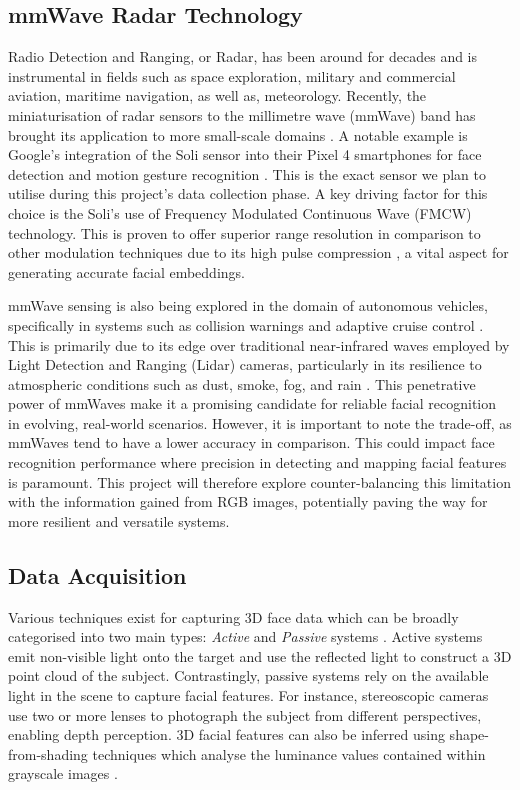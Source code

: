 \documentclass{interim}
\begin{document}
\subsection{mmWave Radar Technology}
Radio Detection and Ranging, or Radar, has been around for decades and is instrumental in fields such as space exploration, military and commercial aviation, maritime navigation, as well as, meteorology. Recently, the miniaturisation of radar sensors to the millimetre wave (mmWave) band has brought its application to more small-scale domains \cite{soumya2023recent}. A notable example is Google's integration of the Soli sensor into their Pixel 4 smartphones for face detection and motion gesture recognition \cite{googleblog2020}. This is the exact sensor we plan to utilise during this project's data collection phase. A key driving factor for this choice is the Soli's use of Frequency Modulated Continuous Wave (FMCW) technology. This is proven to offer superior range resolution in comparison to other modulation techniques due to its high pulse compression \cite{mahafza2005radar}, a vital aspect for generating accurate facial embeddings. 

mmWave sensing is also being explored in the domain of autonomous vehicles, specifically in systems such as collision warnings and adaptive cruise control \cite{dfrobot}. This is primarily due to its edge over traditional near-infrared waves employed by Light Detection and Ranging (Lidar) cameras, particularly in its resilience to atmospheric conditions such as dust, smoke, fog, and rain \cite{cadenceblog2022}. This penetrative power of mmWaves make it a promising candidate for reliable facial recognition in evolving, real-world scenarios. However, it is important to note the trade-off, as mmWaves tend to have a lower accuracy in comparison. This could impact face recognition performance where precision in detecting and mapping facial features is paramount. This project will therefore explore counter-balancing this limitation with the information gained from RGB images, potentially paving the way for more resilient and versatile systems.


\subsection{Data Acquisition}
\label{background:data_acquisition}
Various techniques exist for capturing 3D face data which can be broadly categorised into two main types: \textit{Active} and \textit{Passive} systems \cite{zhou20183d}. Active systems emit non-visible light onto the target and use the reflected light to construct a 3D point cloud of the subject. Contrastingly, passive systems rely on the available light in the scene to capture facial features. For instance, stereoscopic cameras use two or more lenses to photograph the subject from different perspectives, enabling depth perception. 3D facial features can also be inferred using shape-from-shading techniques which analyse the luminance values contained within grayscale images \cite{horn1977understanding}.
\end{document}
